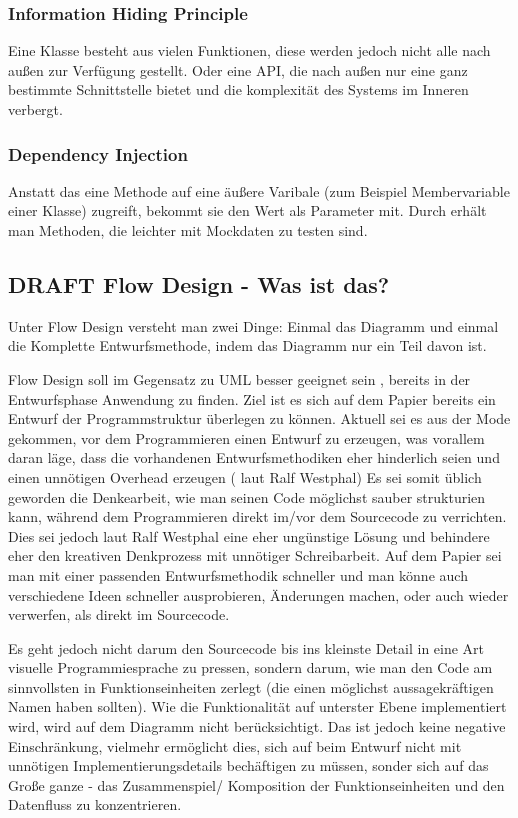 \documentclass[11pt]{article}
\begin{document}
\subsubsection{Information Hiding Principle}
\label{sec:orgheadline11}
Eine Klasse besteht aus vielen Funktionen, diese werden jedoch nicht alle nach
außen zur Verfügung gestellt.
Oder eine API, die nach außen nur eine ganz bestimmte Schnittstelle bietet und
die komplexität des Systems im Inneren verbergt.

\subsubsection{Dependency Injection}
\label{sec:orgheadline12}
Anstatt das eine Methode auf eine äußere Varibale (zum Beispiel Membervariable einer
Klasse) zugreift, bekommt sie den Wert als Parameter mit.
Durch erhält man Methoden, die leichter mit Mockdaten zu testen sind.




\subsection{{\bfseries\sffamily DRAFT} Flow Design - Was ist das?}
\label{sec:orgheadline14}

Unter Flow Design versteht man zwei Dinge:
Einmal das Diagramm und einmal die Komplette Entwurfsmethode, indem das
Diagramm nur ein Teil davon ist.

Flow Design soll im Gegensatz zu UML besser geeignet sein , bereits in der Entwurfsphase Anwendung zu finden.
Ziel ist es sich auf dem Papier bereits ein Entwurf der Programmstruktur überlegen zu können.
Aktuell sei es aus der Mode gekommen, vor dem Programmieren einen Entwurf zu erzeugen, was vorallem daran läge, dass die vorhandenen
Entwurfsmethodiken eher hinderlich seien und einen unnötigen Overhead erzeugen ( laut Ralf Westphal)
Es sei somit üblich geworden die Denkearbeit, wie man seinen Code möglichst sauber strukturien kann,
während dem Programmieren direkt im/vor dem Sourcecode zu verrichten.
Dies sei jedoch laut Ralf Westphal eine eher ungünstige Lösung und behindere eher den kreativen Denkprozess mit
unnötiger Schreibarbeit.
Auf dem Papier sei man mit einer passenden Entwurfsmethodik schneller und man könne auch verschiedene Ideen schneller
ausprobieren, Änderungen machen, oder auch wieder verwerfen, als direkt im Sourcecode.

Es geht jedoch nicht darum den Sourcecode bis ins kleinste Detail in eine Art visuelle Programmiesprache zu pressen,
sondern darum, wie man den Code am sinnvollsten in Funktionseinheiten zerlegt (die einen möglichst aussagekräftigen Namen haben sollten).
Wie die Funktionalität auf unterster Ebene implementiert wird, wird auf dem Diagramm nicht berücksichtigt.
Das ist jedoch keine negative Einschränkung, vielmehr ermöglicht dies, sich auf beim Entwurf nicht mit unnötigen Implementierungsdetails bechäftigen zu
müssen, sonder sich auf das Große ganze - das Zusammenspiel/ Komposition der Funktionseinheiten und den Datenfluss zu konzentrieren.
\end{document}

